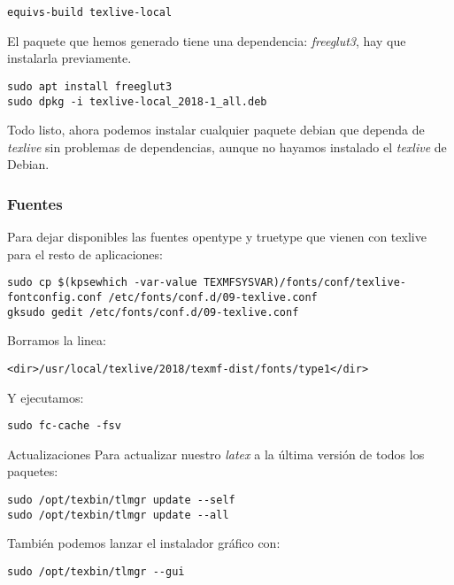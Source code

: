 \documentclass[
  12pt,
  spanish,
]{article}
\begin{document}
\begin{verbatim}
equivs-build texlive-local
\end{verbatim}

El paquete que hemos generado tiene una dependencia: \emph{freeglut3},
hay que instalarla previamente.

\begin{verbatim}
sudo apt install freeglut3
sudo dpkg -i texlive-local_2018-1_all.deb
\end{verbatim}

Todo listo, ahora podemos instalar cualquier paquete debian que dependa
de \emph{texlive} sin problemas de dependencias, aunque no hayamos
instalado el \emph{texlive} de Debian.

\hypertarget{fuentes}{%
\subsubsection{Fuentes}\label{fuentes}}

Para dejar disponibles las fuentes opentype y truetype que vienen con
texlive para el resto de aplicaciones:

\begin{verbatim}
sudo cp $(kpsewhich -var-value TEXMFSYSVAR)/fonts/conf/texlive-fontconfig.conf /etc/fonts/conf.d/09-texlive.conf
gksudo gedit /etc/fonts/conf.d/09-texlive.conf
\end{verbatim}

Borramos la linea:

\begin{verbatim}
<dir>/usr/local/texlive/2018/texmf-dist/fonts/type1</dir>
\end{verbatim}

Y ejecutamos:

\begin{verbatim}
sudo fc-cache -fsv
\end{verbatim}

Actualizaciones Para actualizar nuestro \emph{latex} a la última versión
de todos los paquetes:

\begin{verbatim}
sudo /opt/texbin/tlmgr update --self
sudo /opt/texbin/tlmgr update --all
\end{verbatim}

También podemos lanzar el instalador gráfico con:

\begin{verbatim}
sudo /opt/texbin/tlmgr --gui
\end{verbatim}
\end{document}
